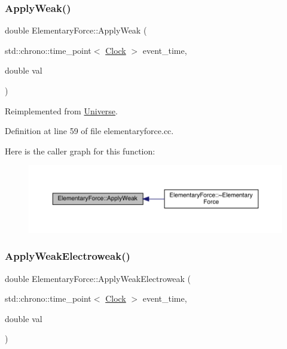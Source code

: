 \subsubsection{\texorpdfstring{Apply\+Weak()}{ApplyWeak()}}
{\footnotesize\ttfamily double Elementary\+Force\+::\+Apply\+Weak (\begin{DoxyParamCaption}\item[{std\+::chrono\+::time\+\_\+point$<$ \hyperlink{universe_8h_a0ef8d951d1ca5ab3cfaf7ab4c7a6fd80}{Clock} $>$}]{event\+\_\+time,  }\item[{double}]{val }\end{DoxyParamCaption})\hspace{0.3cm}{\ttfamily [virtual]}}



Reimplemented from \hyperlink{class_universe_a6d1226b3adec3c42a833afdbb6a65a92}{Universe}.



Definition at line 59 of file elementaryforce.\+cc.

Here is the caller graph for this function\+:
\nopagebreak
\begin{figure}[H]
\begin{center}
\leavevmode
\includegraphics[width=350pt]{class_elementary_force_aabf66a859e6e808a65c6929cd16f7597_icgraph}
\end{center}
\end{figure}
\mbox{\label{class_elementary_force_a2d3a5444c771f35d66d4151c62f53b12}} 
\subsubsection{\texorpdfstring{Apply\+Weak\+Electroweak()}{ApplyWeakElectroweak()}}
{\footnotesize\ttfamily double Elementary\+Force\+::\+Apply\+Weak\+Electroweak (\begin{DoxyParamCaption}\item[{std\+::chrono\+::time\+\_\+point$<$ \hyperlink{universe_8h_a0ef8d951d1ca5ab3cfaf7ab4c7a6fd80}{Clock} $>$}]{event\+\_\+time,  }\item[{double}]{val }\end{DoxyParamCaption})\hspace{0.3cm}{\ttfamily [virtual]}}



